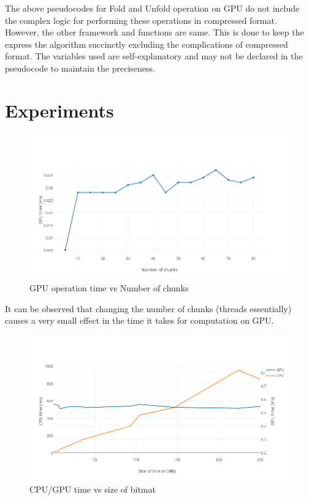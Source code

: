 \documentclass{article}
\begin{document}
The above pseudocodes for Fold and Unfold operation on GPU do not include the complex logic for performing these operations in compressed format. However, the other framework and functions are same. This is done to keep the express the algorithm succinctly excluding the complications of compressed format. The variables used are self-explanatory and may not be declared in the pseudocode to maintain the preciseness. 

\section*{Experiments}
\begin{figure}[ht]
        \includegraphics[width=.75\textwidth]{split_vs_gpu_time.png}
        \caption{GPU operation time vs Number of chunks}
        \centering
\end{figure}

It can be observed that changing the number of chunks (threads essentially) causes a very small effect in the time it takes for computation on GPU.

\begin{figure}[ht]
        \includegraphics[width=.75\textwidth]{gpu_vs_cpu.png}
        \caption{CPU/GPU time vs size of bitmat}
        \centering
\end{figure}
\end{document}
